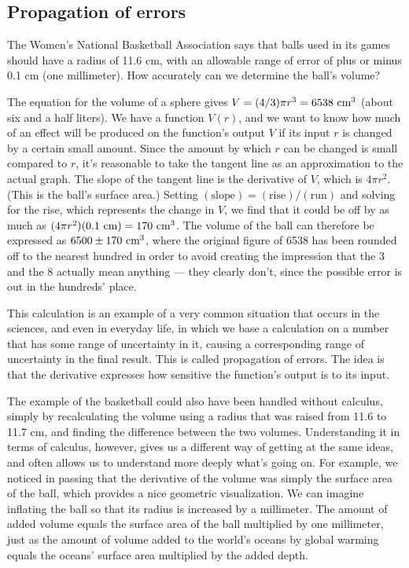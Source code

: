 \subsection{Propagation of errors}

The Women's National Basketball Association says that balls used in its games should have
a radius of 11.6 cm, with an allowable range of error of plus or minus 0.1 cm (one millimeter).
How accurately can we determine the ball's volume?


The equation for the volume of a sphere gives $V=(4/3)\pi r^3=6538\ \textup{cm}^3$ (about six and
a half liters). We have a function $V(r)$, and we want to know how much of an effect will be
produced on the function's output $V$ if its input $r$ is changed by a certain small amount.
Since the amount by which $r$ can be changed is small compared to $r$, it's reasonable to
take the tangent line as an approximation to the actual graph. The slope of the tangent line
is the derivative of $V$, which is $4\pi r^2$. (This is the ball's surface area.)
Setting $(\text{slope})=(\text{rise})/(\text{run})$
and solving for the rise, which represents the change in $V$, we find that it could be off by
as much as $(4\pi r^2)(0.1\ \textup{cm})=170\ \textup{cm}^3$. The volume of the ball can therefore
be expressed as $6500\pm 170\ \textup{cm}^3$, where the original figure of 6538 has been rounded off
to the nearest hundred in order to avoid creating the impression that the 3 and the 8 actually
mean anything --- they clearly don't, since the possible error is out in the hundreds' place.

This calculation is an example of a very common situation that occurs in the sciences, and even
in everyday life, in which we base a calculation on a number that has some range of uncertainty
in it, causing a corresponding range of uncertainty in the final result. This is called
propagation of errors. The idea is that the derivative expresses how sensitive the function's
output is to its input.

The example of the basketball could also have been handled without calculus, simply by recalculating the volume
using a radius that was raised from 11.6 to 11.7 cm, and finding the difference between the two volumes.
Understanding it in terms of calculus, however, gives us a different way of getting at the same
ideas, and often allows us to understand more deeply what's going on. For example, we noticed in passing that
the derivative of the volume was simply the surface area of the ball, which provides a nice geometric
visualization. We can imagine inflating the ball so that its radius is increased by a millimeter. The amount of
added volume equals the surface area of the ball multiplied by one millimeter, just as the amount of volume
added to the world's oceans by global warming equals the oceans' surface area multiplied by the added depth.

